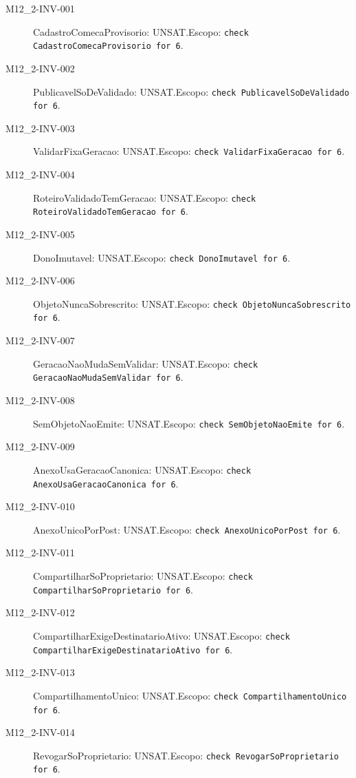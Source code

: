 \begin{description}
\item[M12\_2-INV-001] CadastroComecaProvisorio: UNSAT.\newline Escopo: \texttt{check CadastroComecaProvisorio for 6}.
\item[M12\_2-INV-002] PublicavelSoDeValidado: UNSAT.\newline Escopo: \texttt{check PublicavelSoDeValidado for 6}.
\item[M12\_2-INV-003] ValidarFixaGeracao: UNSAT.\newline Escopo: \texttt{check ValidarFixaGeracao for 6}.
\item[M12\_2-INV-004] RoteiroValidadoTemGeracao: UNSAT.\newline Escopo: \texttt{check RoteiroValidadoTemGeracao for 6}.
\item[M12\_2-INV-005] DonoImutavel: UNSAT.\newline Escopo: \texttt{check DonoImutavel for 6}.
\item[M12\_2-INV-006] ObjetoNuncaSobrescrito: UNSAT.\newline Escopo: \texttt{check ObjetoNuncaSobrescrito for 6}.
\item[M12\_2-INV-007] GeracaoNaoMudaSemValidar: UNSAT.\newline Escopo: \texttt{check GeracaoNaoMudaSemValidar for 6}.
\item[M12\_2-INV-008] SemObjetoNaoEmite: UNSAT.\newline Escopo: \texttt{check SemObjetoNaoEmite for 6}.
\item[M12\_2-INV-009] AnexoUsaGeracaoCanonica: UNSAT.\newline Escopo: \texttt{check AnexoUsaGeracaoCanonica for 6}.
\item[M12\_2-INV-010] AnexoUnicoPorPost: UNSAT.\newline Escopo: \texttt{check AnexoUnicoPorPost for 6}.
\item[M12\_2-INV-011] CompartilharSoProprietario: UNSAT.\newline Escopo: \texttt{check CompartilharSoProprietario for 6}.
\item[M12\_2-INV-012] CompartilharExigeDestinatarioAtivo: UNSAT.\newline Escopo: \texttt{check CompartilharExigeDestinatarioAtivo for 6}.
\item[M12\_2-INV-013] CompartilhamentoUnico: UNSAT.\newline Escopo: \texttt{check CompartilhamentoUnico for 6}.
\item[M12\_2-INV-014] RevogarSoProprietario: UNSAT.\newline Escopo: \texttt{check RevogarSoProprietario for 6}.

\end{description}
